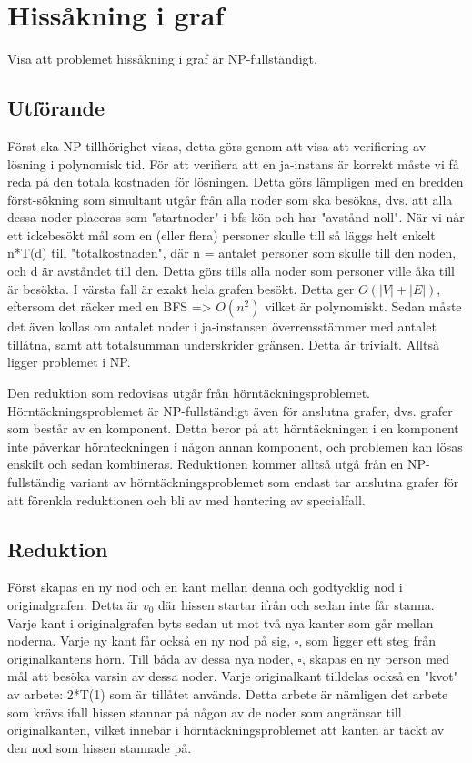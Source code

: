 \documentclass[a4paper,10pt,twoside]{article}
\begin{document}
\newpage

\section{Hissåkning i graf}

Visa att problemet hissåkning i graf är NP-fullständigt.

\subsection{Utförande}

Först ska NP-tillhörighet visas, detta görs genom att visa att verifiering av lösning i polynomisk tid. För att verifiera att en ja-instans är korrekt måste vi få reda på den totala kostnaden för lösningen. Detta görs lämpligen med en bredden först-sökning som simultant utgår från alla noder som ska besökas, dvs. att alla dessa noder placeras som "startnoder" i bfs-kön och har "avstånd noll". När vi når ett ickebesökt mål som en (eller flera) personer skulle till så läggs helt enkelt n*T(d) till "totalkostnaden", där n = antalet personer som skulle till den noden, och d är avståndet till den. Detta görs tills alla noder som personer ville åka till är besökta. I värsta fall är exakt hela grafen besökt. Detta ger $O(|V|+|E|)$, eftersom det räcker med en BFS => $O(n^2)$ vilket är polynomiskt. Sedan måste det även kollas om antalet noder i ja-instansen överrensstämmer med antalet tillåtna, samt att totalsumman underskrider gränsen. Detta är trivialt. Alltså ligger problemet i NP.

Den reduktion som redovisas utgår från hörntäckningsproblemet. Hörntäckningsproblemet är NP-fullständigt även för anslutna grafer, dvs. grafer som består av en komponent. Detta beror på att hörntäckningen i en komponent inte påverkar hörnteckningen i någon annan komponent, och problemen kan lösas enskilt och sedan kombineras. Reduktionen kommer alltså utgå från en NP-fullständig variant av hörntäckningsproblemet som endast tar anslutna grafer för att förenkla reduktionen och bli av med hantering av specialfall.

\subsection {Reduktion}

Först skapas en ny nod och en kant mellan denna och godtycklig nod i originalgrafen. Detta är $v_0$ där hissen startar ifrån och sedan inte får stanna. Varje kant i originalgrafen byts sedan ut mot två nya kanter som går mellan noderna. Varje ny kant får också en ny nod på sig, $\square$, som ligger ett steg från originalkantens hörn. Till båda av dessa nya noder, $\square$, skapas en ny person med mål att besöka varsin av dessa noder. Varje originalkant tilldelas också en "kvot" av arbete: 2*T(1) som är tillåtet används. Detta arbete är nämligen det arbete som krävs ifall hissen stannar på någon av de noder som angränsar till originalkanten, vilket innebär i hörntäckningsproblemet att kanten är täckt av den nod som hissen stannade på.
\end{document}
